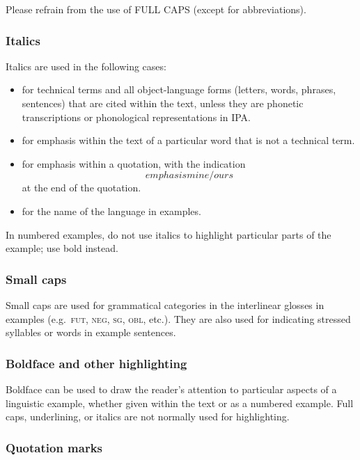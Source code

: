 \documentclass[]{glossa}
\begin{document}
Please refrain from the use of FULL CAPS (except for abbreviations).

\hypertarget{italics}{%
\subsubsection{Italics}\label{italics}}

Italics are used in the following cases:

\begin{itemize}
\item
  for technical terms and all object-language forms (letters, words,
  phrases, sentences) that are cited within the text, unless they are
  phonetic transcriptions or phonological representations in IPA.
\item
  for emphasis within the text of a particular word that is not a
  technical term.
\item
  for emphasis within a quotation, with the indication \[emphasis
  mine/ours\] at the end of the quotation.
\item
  for the name of the language in examples.
\end{itemize}

In numbered examples, do not use italics to highlight particular parts
of the example; use bold instead.

\hypertarget{small-caps}{%
\subsubsection{Small caps}\label{small-caps}}

Small caps are used for grammatical categories in the interlinear
glosses in examples (e.g.~\textsc{fut, neg, sg, obl}, etc.). They are
also used for indicating stressed syllables or words in example
sentences.

\hypertarget{boldface-and-other-highlighting}{%
\subsubsection{Boldface and other
highlighting}\label{boldface-and-other-highlighting}}

Boldface can be used to draw the reader's attention to particular
aspects of a linguistic example, whether given within the text or as a
numbered example. Full caps, underlining, or italics are not normally
used for highlighting.

\hypertarget{quotation-marks}{%
\subsubsection{Quotation marks}\label{quotation-marks}}
\end{document}
